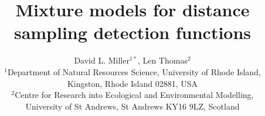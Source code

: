 \documentclass[useAMS,referee]{biom}
\title[Mixture model detection functions]{Mixture models for distance sampling detection functions}
\author{David L. Miller$^{1*}$\email{dave@ninepointeightone.net}, Len Thomas$^{2}$\\
$^{1}$Department of Natural Resources Science, University of Rhode Island,\\ 
Kingston, Rhode Island 02881, USA\\
$^{2}$Centre for Research into Ecological and Environmental Modelling,\\
University of St Andrews, St Andrews KY16 9LZ, Scotland}
\begin{document}



\label{firstpage}

\end{document}
